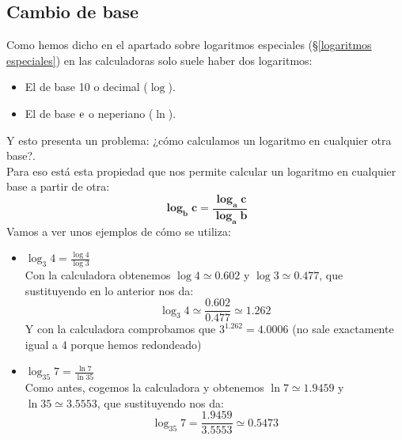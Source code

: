 \documentclass[a4paper,10pt,answers]{exam}
\begin{document}
\subsection{Cambio de base}
Como hemos dicho en el apartado sobre logaritmos especiales (\S\ref{logaritmos especiales}) en las calculadoras solo suele haber dos logaritmos:
\begin{itemize}
	\item El de base 10 o decimal ($\log$).
	\item El de base $\mathrm{e}$ o neperiano ($\ln$).
\end{itemize}
Y esto presenta un problema: ¿cómo calculamos un logaritmo en cualquier otra base?.\\
Para eso está esta propiedad que nos permite calcular un logaritmo en cualquier base a partir de otra:
\large
\[\boldsymbol{\log_b c = \frac{\log_a c}{\log_a b}}\]
\normalsize
Vamos a ver unos ejemplos de cómo se utiliza:
\begin{itemize}
	\item $\log_3 4 = \frac{\log 4}{\log 3}$\\
	
	Con la calculadora obtenemos $\log 4 \simeq 0.602$ y $\log 3 \simeq 0.477$, que sustituyendo en lo anterior nos da:
	\[\log_3 4 \simeq \frac{0.602}{0.477} \simeq 1.262\]
	Y con la calculadora comprobamos que $3^{1.262} = 4.0006$ (no sale exactamente igual a 4 porque hemos redondeado)
	
	\item $\log_{35} 7 = \frac{\ln 7}{\ln 35}$\\
	
	Como antes, cogemos la calculadora y obtenemos $\ln 7 \simeq 1.9459$ y $\ln 35 \simeq 3.5553$, que sustituyendo nos da:
	\[\log_{35} 7 = \frac{1.9459}{3.5553} \simeq 0.5473\]
\end{itemize}
\end{document}
